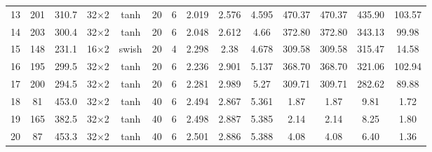 \begin{tabular}{lcc cccc ccccccc}
  13 & 201 & 310.7 & 32$\times$2 & tanh & 20 & 6 & \num{2.019} & \num{2.576} & \num{4.595} & 470.37 & 470.37 & 435.90 & 103.57 \\
  14 & 203 & 300.4 & 32$\times$2 & tanh & 20 & 6 & \num{2.048} & \num{2.612} & \num{4.66} & 372.80 & 372.80 & 343.13 & 99.98 \\
  15 & 148 & 231.1 & 16$\times$2 & swish & 20 & 4 & \num{2.298} & \num{2.38} & \num{4.678} & 309.58 & 309.58 & 315.47 & 14.58 \\
  16 & 195 & 299.5 & 32$\times$2 & tanh & 20 & 6 & \num{2.236} & \num{2.901} & \num{5.137} & 368.70 & 368.70 & 321.06 & 102.94 \\
  17 & 200 & 294.5 & 32$\times$2 & tanh & 20 & 6 & \num{2.281} & \num{2.989} & \num{5.27} & 309.71 & 309.71 & 282.62 & 89.88 \\
  18 & 81 & 453.0 & 32$\times$2 & tanh & 40 & 6 & \num{2.494} & \num{2.867} & \num{5.361} & 1.87 & 1.87 & 9.81 & 1.72 \\
  19 & 165 & 382.5 & 32$\times$2 & tanh & 40 & 6 & \num{2.498} & \num{2.887} & \num{5.385} & 2.14 & 2.14 & 8.25 & 1.80 \\
  20 & 87 & 453.3 & 32$\times$2 & tanh & 40 & 6 & \num{2.501} & \num{2.886} & \num{5.388} & 4.08 & 4.08 & 6.40 & 1.36 \\
\bottomrule
\end{tabular}
